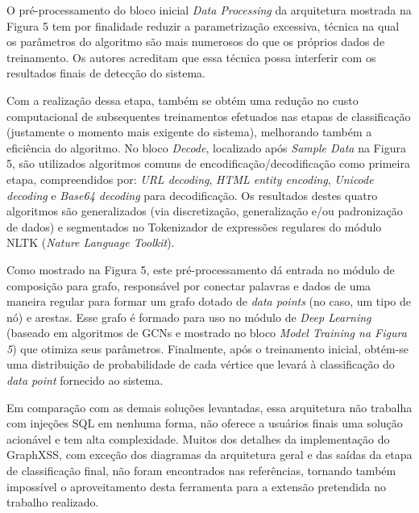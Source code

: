 O pré-processamento do bloco inicial \textit{Data Processing} da arquitetura mostrada na Figura 5 tem por finalidade reduzir a parametrização excessiva, técnica na qual os parâmetros do algoritmo são mais numerosos do que os próprios dados de treinamento. Os autores acreditam que essa técnica possa interferir com os resultados finais de detecção do sistema.

Com a realização dessa etapa, também se obtém uma redução no custo computacional de subsequentes treinamentos efetuados nas etapas de classificação (justamente o momento mais exigente do sistema), melhorando também a eficiência do algoritmo. No bloco \textit{Decode}, localizado após \textit{Sample Data} na Figura 5, são utilizados algoritmos comuns de encodificação/decodificação como primeira etapa, compreendidos por: \textit{URL decoding}, \textit{HTML entity encoding}, \textit{Unicode decoding} e \textit{Base64 decoding} para decodificação. Os resultados destes quatro algoritmos são generalizados (via discretização, generalização e/ou padronização de dados) e segmentados no Tokenizador de expressões regulares do módulo NLTK (\textit{Nature Language Toolkit}).

Como mostrado na Figura 5, este pré-processamento dá entrada no módulo de composição para grafo, responsável por conectar palavras e dados de uma maneira regular para formar um grafo dotado de \textit{data points} (no caso, um tipo de nó) e arestas. Esse grafo é formado para uso no módulo de \textit{Deep Learning} (baseado em algoritmos de GCNs e mostrado no bloco \textit{Model Training na Figura 5}) que otimiza seus parâmetros. Finalmente, após o treinamento inicial, obtém-se uma distribuição de probabilidade de cada vértice que levará à classificação do \textit{data point} fornecido ao sistema. 

Em comparação com as demais soluções levantadas, essa arquitetura não trabalha com injeções SQL em nenhuma forma, não oferece a usuários finais uma solução acionável e tem alta complexidade. Muitos dos detalhes da implementação do GraphXSS, com exceção dos diagramas da arquitetura geral  e das saídas da etapa de classificação final, não foram encontrados nas referências, tornando também impossível o aproveitamento  desta ferramenta para a extensão pretendida no trabalho realizado. 



